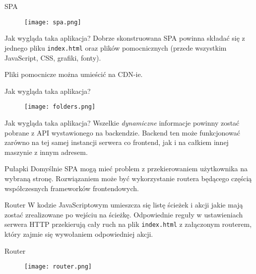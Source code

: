 \begin{frame}{SPA}
	\begin{figure}[t]
		\centering
		\texttt{[image: spa.png]}
	\end{figure}
\end{frame}

\begin{frame}{Jak wygląda taka aplikacja?}	
	Dobrze skonstruowana SPA powinna składać się z jednego pliku \texttt{index.html} oraz plików pomocnicznych (przede wszystkim JavaScript, CSS, grafiki, fonty).
	
	Pliki pomocnicze można umieścić na CDN-ie.
\end{frame}

\begin{frame}{Jak wygląda taka aplikacja?}	
	\begin{figure}[t]
		\centering
		\texttt{[image: folders.png]}
	\end{figure}
\end{frame}

\begin{frame}{Jak wygląda taka aplikacja?}	
	Wszelkie \emph{dynamiczne }informacje powinny zostać pobrane z API wystawionego na backendzie. Backend ten może funkcjonować zarówno na tej samej instancji serwera co frontend, jak i na całkiem innej maszynie z innym adresem.
\end{frame}

\begin{frame}{Pułapki}	
	Domyślnie SPA mogą mieć problem z przekierowaniem użytkownika na wybraną stronę. Rozwiązaniem może być wykorzystanie routera będącego częścią współczesnych frameworków frontendowych.
\end{frame}

\begin{frame}{Router}	
	W kodzie JavaScriptowym umieszcza się listę ścieżek i akcji jakie mają zostać zrealizowane po wejściu na ścieżkę. Odpowiednie reguły w ustawieniach serwera HTTP przekierują cały ruch na plik \texttt{index.html} z załączonym routerem, który zajmie się wywołaniem odpowiedniej akcji.
\end{frame}

\begin{frame}{Router}
	\begin{figure}[t]
		\centering
		\texttt{[image: router.png]}
	\end{figure}
\end{frame}

